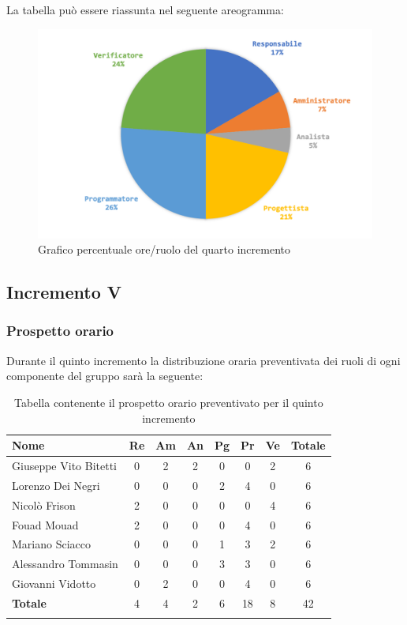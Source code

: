 		La tabella può essere riassunta nel seguente areogramma:
		\begin{figure}[H]
			\centering
			\includegraphics[width=0.8\linewidth]{./images/preventivo/incremento4-2.png}
			\caption{Grafico percentuale ore/ruolo del quarto incremento}
			\label{fig:grafico costi ruolo incremento IV}
		\end{figure}
		
		
		
	\subsection{Incremento V}
		\subsubsection{Prospetto orario}
		Durante il quinto incremento la distribuzione oraria preventivata dei ruoli di ogni componente del gruppo sarà la seguente:
		
		\begin{longtable}{|l|c|c|c|c|c|c|c|}
			\hline
			\rowcolor{lighter-grayer}
			\textbf{Nome} & \textbf{Re} & \textbf{Am} & \textbf{An} & \textbf{Pg}  & \textbf{Pr}   & \textbf{Ve} & \textbf{Totale} \\
			\hline
			\endfirsthead
			
			\hline
			Giuseppe Vito Bitetti 		 & 0 & 2 & 2 & 0 & 0 & 2 & 6\\
			\hline
			\hline
			Lorenzo Dei Negri			 & 0 & 0 & 0 & 2 & 4 & 0 & 6\\
			\hline
			\hline
			Nicolò Frison				    & 2 & 0 & 0 & 0 & 0 & 4 & 6\\
			\hline
			\hline
			Fouad Mouad 				 & 2 & 0 & 0 & 0 & 4 & 0 & 6\\
			\hline
			\hline
			Mariano Sciacco 			 & 0 & 0 & 0 & 1 & 3 & 2 & 6\\
			\hline
			\hline
			Alessandro Tommasin     & 0 & 0 & 0 & 3 & 3 & 0 & 6\\
			\hline
			\hline
			Giovanni Vidotto 			 & 0 & 2 & 0 & 0 & 4 & 0 & 6\\
			\hline 
			\textbf{Totale}			 		& 4 & 4 & 2 & 6 & 18 & 8 & 42\\
			\hline
			\caption{Tabella contenente il prospetto orario preventivato per il quinto incremento}
		\end{longtable}
		\pagebreak
		
